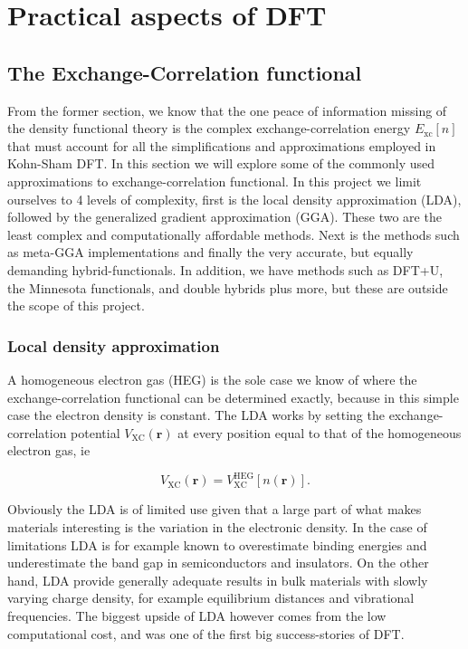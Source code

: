 \chapter{Practical aspects of DFT}
\label{sec:Practical DFT}

\section{The Exchange-Correlation functional}
From the former section, we know that the one peace of information missing of the density functional theory is the complex exchange-correlation energy $E_{\text{xc}}[n]$ that must account for all the simplifications and approximations employed in Kohn-Sham DFT. In this section we will explore some of the commonly used approximations to exchange-correlation functional. In this project we limit ourselves to 4 levels of complexity, first is the local density approximation (LDA), followed by the generalized gradient approximation (GGA). These two are the least complex and computationally affordable methods. Next is the methods such as meta-GGA implementations and finally the very accurate, but equally demanding hybrid-functionals. In addition, we have methods such as DFT+U, the Minnesota functionals, and double hybrids plus more, but these are outside the scope of this project.  

\subsection{Local density approximation}
A homogeneous electron gas (HEG) is the sole case we know of where the exchange-correlation functional can be determined exactly, because in this simple case the electron density is constant. The LDA works by setting the exchange-correlation potential $V_\text{XC}(\boldsymbol{r})$ at every position equal to that of the homogeneous electron gas, ie

\begin{equation}
V_\text{XC}(\boldsymbol{r}) = V_\text{XC} ^\text{HEG}[n(\boldsymbol{r})] .
\end{equation} 

Obviously the LDA is of limited use given that a large part of what makes materials interesting is the variation in the electronic density. In the case of limitations LDA is for example known to overestimate binding energies and  underestimate the band gap in semiconductors and insulators. On the other hand, LDA provide generally adequate results in bulk materials with slowly varying charge density, for example equilibrium distances and vibrational frequencies. The biggest upside of LDA however comes from the low computational cost, and was one of the first big success-stories of DFT. 



